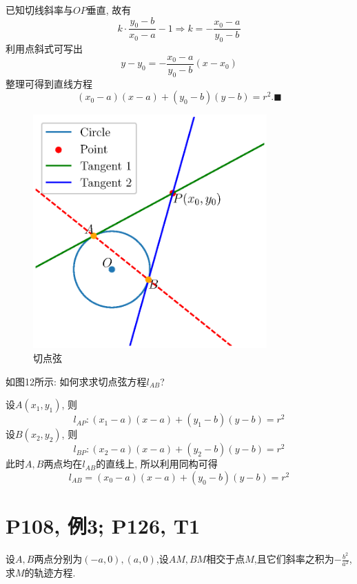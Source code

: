 \documentclass{book}
\begin{document}
        已知\textcolor[rgb]{0.75,0.17,0.22}{切线斜率与$OP$垂直}, 故有$$
        k\cdot \frac{y_0-b}{x_0-a}-1\Longrightarrow k=-\frac{x_0-a}{y_0-b}
        $$
        利用点斜式可写出$$y-y_0=-\frac{x_0-a}{y_0-b}\left( x-x_0 \right)$$
        整理可得到直线方程$$\left( x_0-a \right)\left( x-a \right)+\left( y_0-b \right)\left( y-b \right)=r^2.\blacksquare$$

        \begin{figure}[htbp]
            \centering
            \includegraphics[width=0.8\textwidth]{img/TangentOfCircle.eps}
            \caption{切点弦}
        \end{figure}
        
        如图12所示: 如何求求切点弦方程$l_{AB}$?

        设$A(x_1,y_1)$, 则$$l_{AP}:\left( x_1-a \right)\left( x-a \right)+\left( y_1-b \right)\left( y-b \right)=r^2$$
        设$B(x_2,y_2)$, 则$$l_{BP}:\left( x_2-a \right)\left( x-a \right)+\left( y_2-b \right)\left( y-b \right)=r^2$$
        此时$A,B$两点均在$l_{AB}$的直线上, 所以利用\textcolor[rgb]{0.75,0.17,0.22}{同构}可得$$l_{AB}=\left( x_0-a \right)\left( x-a \right)+\left( y_0-b \right)\left( y-b \right)=r^2$$
        \section{\textcolor[rgb]{0.11,0.65,0.52}{P108, 例3; P126, T1}}
        \begin{boxB}
            设$A,B$两点分别为$(-a,0),(a,0)$,设$AM,BM$相交于点$M$,且它们斜率之积为$\displaystyle -\frac{b^2}{a^2}$, 求$M$的轨迹方程. 
        \end{boxB}
\end{document}
